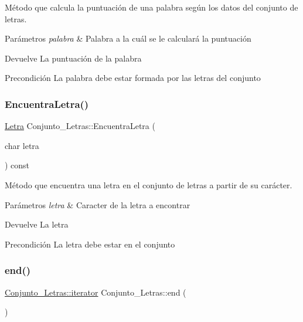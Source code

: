 Método que calcula la puntuación de una palabra según los datos del conjunto de letras. 


\begin{DoxyParams}{Parámetros}
{\em palabra} & Palabra a la cuál se le calculará la puntuación \\
\hline
\end{DoxyParams}
\begin{DoxyReturn}{Devuelve}
La puntuación de la palabra 
\end{DoxyReturn}
\begin{DoxyPrecond}{Precondición}
La palabra debe estar formada por las letras del conjunto 
\end{DoxyPrecond}
\mbox{\label{classConjunto__Letras_ac004308c22155ad0f3a9f2a890f03727}} 
\subsubsection{\texorpdfstring{Encuentra\+Letra()}{EncuentraLetra()}}
{\footnotesize\ttfamily \hyperlink{classLetra}{Letra} Conjunto\+\_\+\+Letras\+::\+Encuentra\+Letra (\begin{DoxyParamCaption}\item[{char}]{letra }\end{DoxyParamCaption}) const}



Método que encuentra una letra en el conjunto de letras a partir de su carácter. 


\begin{DoxyParams}{Parámetros}
{\em letra} & Caracter de la letra a encontrar \\
\hline
\end{DoxyParams}
\begin{DoxyReturn}{Devuelve}
La letra 
\end{DoxyReturn}
\begin{DoxyPrecond}{Precondición}
La letra debe estar en el conjunto 
\end{DoxyPrecond}
\mbox{\label{classConjunto__Letras_a29f4eafc4df0b35a596bae262d53a7cb}} 
\subsubsection{\texorpdfstring{end()}{end()}\hspace{0.1cm}{\footnotesize\ttfamily [1/2]}}
{\footnotesize\ttfamily \hyperlink{classConjunto__Letras_a2be8a16582f74bbe7561955083f02a52}{Conjunto\+\_\+\+Letras\+::iterator} Conjunto\+\_\+\+Letras\+::end (\begin{DoxyParamCaption}{ }\end{DoxyParamCaption})}



